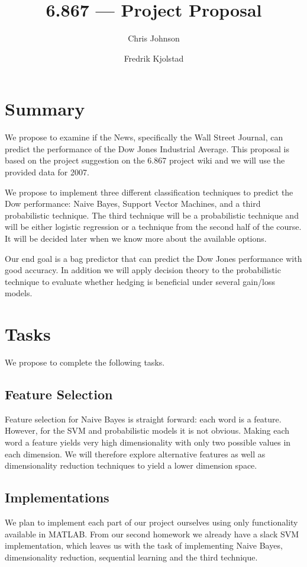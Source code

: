 \documentclass[10pt]{article}
\begin{document}
\title{6.867 --- Project Proposal}
\author{Chris Johnson \and Fredrik Kjolstad}
\date{}
\maketitle

\section{Summary}
We propose to examine if the News, specifically the Wall Street Journal, can predict the performance of the Dow Jones Industrial Average.
This proposal is based on the project suggestion on the 6.867 project wiki and we will use the provided data for 2007.

We propose to implement three different classification techniques to predict the Dow performance: Naive Bayes, Support Vector Machines, and a third probabilistic technique. The third technique will be a probabilistic technique and will be either logistic regression or a technique from the second half of the course.
It will be decided later when we know more about the available options.

Our end goal is a bag predictor that can predict the Dow Jones performance with good accuracy.
In addition we will apply decision theory to the probabilistic technique to evaluate whether hedging is beneficial under several gain/loss models.

\section{Tasks}
We propose to complete the following tasks.
\subsection{Feature Selection}
Feature selection for Naive Bayes is straight forward: each word is a feature.
However, for the SVM and probabilistic models it is not obvious.
Making each word a feature yields very high dimensionality with only two possible values in each dimension.
We will therefore explore alternative features as well as dimensionality reduction techniques to yield a lower dimension space.

\subsection{Implementations}
We plan to implement each part of our project ourselves using only functionality available in MATLAB.
From our second homework we already have a slack SVM implementation, which leaves us with the task of implementing Naive Bayes, dimensionality reduction, sequential learning and the third technique.
\end{document}
